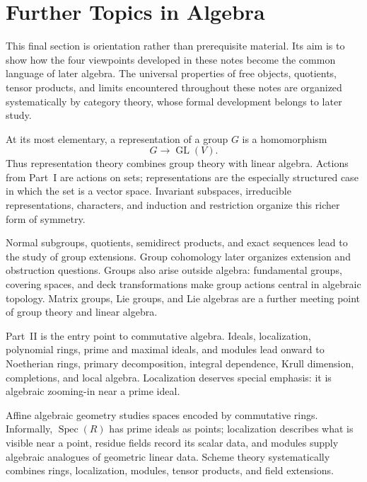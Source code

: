 \section{Further Topics in Algebra}

This final section is orientation rather than prerequisite material.  Its aim
is to show how the four viewpoints developed in these notes become the common
language of later algebra.  The universal properties of free objects,
quotients, tensor products, and limits encountered throughout these notes are
organized systematically by category theory, whose formal development belongs
to later study.


At its most elementary, a representation of a group \(G\) is a homomorphism
\[
G\longrightarrow\operatorname{GL}(V).
\]
Thus representation theory combines group theory with linear algebra.
Actions from Part~I are actions on sets; representations are the especially
structured case in which the set is a vector space.  Invariant subspaces,
irreducible representations, characters, and induction and restriction
organize this richer form of symmetry.

Normal subgroups, quotients, semidirect products, and exact sequences lead to
the study of group extensions.  Group cohomology later organizes extension
and obstruction questions.  Groups also arise outside algebra: fundamental
groups, covering spaces, and deck transformations make group actions central
in algebraic topology.  Matrix groups, Lie groups, and Lie algebras are a
further meeting point of group theory and linear algebra.


Part~II is the entry point to commutative algebra.  Ideals, localization,
polynomial rings, prime and maximal ideals, and modules lead onward to
Noetherian rings, primary decomposition, integral dependence, Krull
dimension, completions, and local algebra.  Localization deserves special
emphasis: it is algebraic zooming-in near a prime ideal.

Affine algebraic geometry studies spaces encoded by commutative rings.
Informally, \(\operatorname{Spec}(R)\) has prime ideals as points;
localization describes what is visible near a point, residue fields record
its scalar data, and modules supply algebraic analogues of geometric linear
data.  Scheme theory systematically combines rings, localization, modules,
tensor products, and field extensions.

